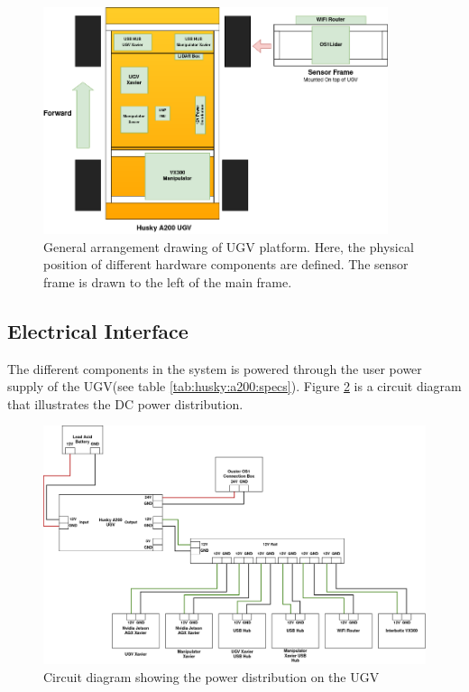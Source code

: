 \begin{figure}[H]
  \centering
   \includegraphics[width = 0.9\textwidth]{Figures/general_arrangement.drawio.png}
  \caption{General arrangement drawing of UGV platform. Here, the physical position of different hardware components are defined. The sensor frame is drawn to the left of the main frame.}
  \label{fig:general_arrangement}
\end{figure}

\subsection{Electrical Interface}\label{M:H:ElectricalInterface}
The different components in the system is powered through the user power supply of the UGV(see table \ref{tab:husky:a200:specs}). Figure \ref{fig:circuit_diagram} is a circuit diagram that illustrates the DC power distribution.

\begin{figure}[H]
  \centering
  \includegraphics[width = 1\textwidth]{Figures/circuit_diagram.drawio.png}
  \caption{Circuit diagram showing the power distribution on the UGV}
  \label{fig:circuit_diagram}
\end{figure}

